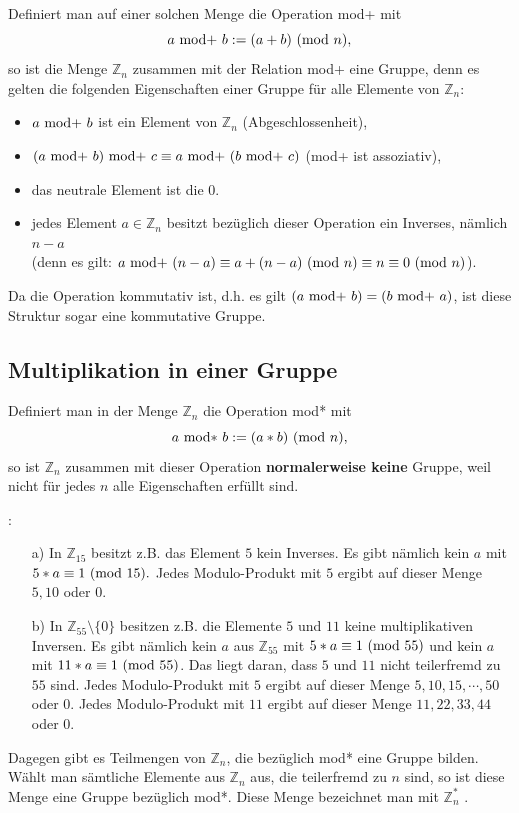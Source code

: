 \begin{refsegment}
Definiert man auf einer solchen Menge die Operation mod+ mit
$$ a {\rm ~mod+~} b := (a + b){\rm ~(mod~}n) , $$
so ist die Menge $\mathbb{Z}_n$ zusammen mit der Relation mod+ eine Gruppe, denn es
gelten die folgenden Eigenschaften einer Gruppe für alle Elemente von $\mathbb{Z}_n$:
\begin{itemize}
    \item   $ a {\rm ~mod+~} b$ ist ein Element von $\mathbb{Z}_n$  (Abgeschlossenheit),
    \item   $(a {\rm ~mod+~} b) {\rm ~mod+~} c \equiv a {\rm ~mod+~} (b {\rm ~mod+~} c)$  (mod+ ist assoziativ),
    \item   das neutrale Element ist die $0$.
  \item   jedes Element $a \in \mathbb{Z}_n$ besitzt bezüglich dieser Operation ein Inverses, nämlich $n-a$\\
                (denn es gilt: $a {\rm ~mod+~} (n-a) \equiv a + (n-a){\rm ~(mod~}n) \equiv n \equiv 0 {\rm ~(mod~}n)$).
\end{itemize}
Da die Operation kommutativ ist, d.h. es gilt $(a {\rm ~mod+~} b) = (b {\rm ~mod+~} a)$, ist diese Struktur  sogar
eine \glqq kommutative Gruppe\grqq.


\subsection{Multiplikation in einer Gruppe}

Definiert man in der Menge $\mathbb{Z}_n$ die Operation mod* mit
$$ a {\rm ~mod*~} b := (a * b){\rm ~(mod~}n), $$
so ist $\mathbb{Z}_n$ zusammen mit dieser Operation \textbf{normalerweise keine} Gruppe, weil
nicht für jedes $n$ alle Eigenschaften erfüllt sind.

\begin{example}{:}
\mbox{}
\begin{itemize}
\item[a)] In $\mathbb{Z}_{15}$ besitzt z.B. das Element $5$ kein Inverses.
  Es gibt nämlich kein $a$ mit\\ $5 * a \equiv 1 {\rm ~(mod~}15).$
  Jedes Modulo-Produkt mit $5$ ergibt auf dieser Menge $5, 10$ oder $0$.
\item[b)] In $\mathbb{Z}_{55} \setminus \{0\}$ besitzen z.B. die Elemente $5$
  und $11$ keine multiplikativen Inversen. Es gibt nämlich kein $a$ aus
  $\mathbb{Z}_{55}$ mit $5 * a \equiv 1 {\rm ~(mod~}55)$ und kein $a$ mit
  $11 *a \equiv 1 {\rm ~(mod~}55)$.
  Das liegt daran, dass $5$ und $11$ nicht
  teilerfremd zu $55$ sind.
  Jedes Modulo-Produkt mit $5$ ergibt auf dieser Menge $5, 10, 15, \cdots, 50$
  oder $0$. Jedes Modulo-Produkt mit $11$ ergibt auf dieser Menge $11, 22, 33,
  44$ oder $0$.
\end{itemize}
\end{example}
Dagegen gibt es Teilmengen von $\mathbb{Z}_n$, die bezüglich mod* eine Gruppe
bilden.
Wählt man sämtliche Elemente aus $\mathbb{Z}_n$ aus, die teilerfremd zu $n$
sind, so ist diese Menge eine Gruppe bezüglich mod*. Diese Menge bezeichnet
man mit $\mathbb{Z}_n^*$ .


\end{refsegment}
